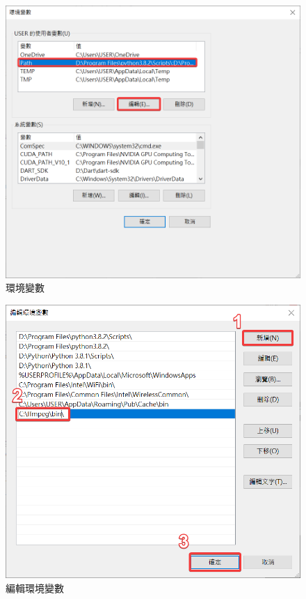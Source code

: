 \documentclass[14pt,a4paper]{report}  %
\begin{document}
\begin{figure}[hbt!]
\begin{center}
\includegraphics[width=15cm]{Q_ffmpeg-3}
\caption{\Large 環境變數}
\label{fig.Q_ffmpeg-3}
\end{center}
\end{figure}


\begin{figure}[hbt!]
\begin{center}
\includegraphics[width=15cm]{Q_ffmpeg-4}
\caption{\Large 編輯環境變數}
\label{fig.Q_ffmpeg-4}
\end{center}
\end{figure}
\end{document}
